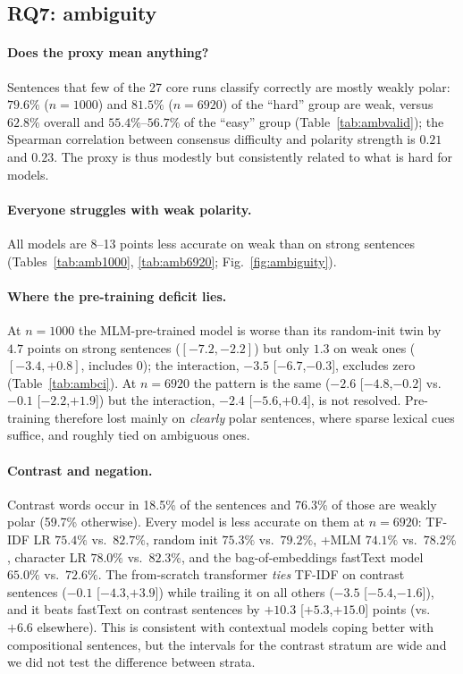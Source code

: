 \documentclass[11pt,a4paper]{article}
\begin{document}
\subsection{RQ7: ambiguity}\label{sec:ambiguity}
\paragraph{Does the proxy mean anything?} Sentences that few of the 27 core runs classify correctly are mostly weakly polar: $79.6\%$ ($n{=}1000$) and $81.5\%$ ($n{=}6920$) of the ``hard'' group are weak, versus $62.8\%$ overall and $55.4\%$--$56.7\%$ of the ``easy'' group (Table~\ref{tab:ambvalid}); the Spearman correlation between consensus difficulty and polarity strength is $0.21$ and $0.23$. The proxy is thus modestly but consistently related to what is hard for models.

\paragraph{Everyone struggles with weak polarity.} All models are 8--13 points less accurate on weak than on strong sentences (Tables~\ref{tab:amb1000}, \ref{tab:amb6920}; Fig.~\ref{fig:ambiguity}).

\paragraph{Where the pre-training deficit lies.} At $n{=}1000$ the MLM-pre-trained model is worse than its random-init twin by $4.7$ points on strong sentences ($[-7.2,-2.2]$) but only $1.3$ on weak ones ($[-3.4,+0.8]$, includes 0); the interaction, $-3.5$ [$-6.7$,$-0.3$], excludes zero (Table~\ref{tab:ambci}). At $n{=}6920$ the pattern is the same ($-2.6$ [$-4.8$,$-0.2$] vs.\ $-0.1$ [$-2.2$,$+1.9$]) but the interaction, $-2.4$ [$-5.6$,$+0.4$], is not resolved. Pre-training therefore lost mainly on \emph{clearly} polar sentences, where sparse lexical cues suffice, and roughly tied on ambiguous ones.

\paragraph{Contrast and negation.} Contrast words occur in 18.5\% of the sentences and 76.3\% of those are weakly polar (59.7\% otherwise). Every model is less accurate on them at $n{=}6920$: TF-IDF LR $75.4\%$ vs.\ $82.7\%$, random init $75.3\%$ vs.\ $79.2\%$, +MLM $74.1\%$ vs.\ $78.2\%$, character LR $78.0\%$ vs.\ $82.3\%$, and the bag-of-embeddings fastText model $65.0\%$ vs.\ $72.6\%$.
The from-scratch transformer \emph{ties} TF-IDF on contrast sentences ($-0.1$ [$-4.3$,$+3.9$]) while trailing it on all others ($-3.5$ [$-5.4$,$-1.6$]), and it beats fastText on contrast sentences by $+10.3$ [$+5.3$,$+15.0$] points (vs.\ $+6.6$ elsewhere). This is consistent with contextual models coping better with compositional sentences, but the intervals for the contrast stratum are wide and we did not test the difference between strata.
\end{document}
